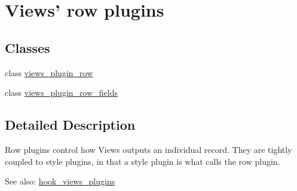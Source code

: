 \hypertarget{group__views__row__plugins}{
\section{Views' row plugins}
\label{group__views__row__plugins}
}
\subsection*{Classes}
\begin{CompactItemize}
\item 
class \hyperlink{classviews__plugin__row}{views\_\-plugin\_\-row}
\item 
class \hyperlink{classviews__plugin__row__fields}{views\_\-plugin\_\-row\_\-fields}
\end{CompactItemize}


\subsection{Detailed Description}
Row plugins control how Views outputs an individual record. They are tightly coupled to style plugins, in that a style plugin is what calls the row plugin.

\begin{Desc}
\item[See also:]\hyperlink{group__views__hooks_g23f6e9972b2ed84fc54b7ff63f44477d}{hook\_\-views\_\-plugins} \end{Desc}
